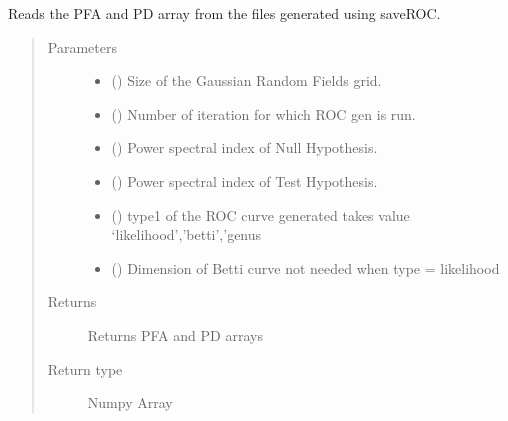 \documentclass[letterpaper,10pt,english]{sphinxmanual}
\begin{document}
\begin{fulllineitems}
\label{\detokenize{utilities:utilities.readROC}}
\sphinxAtStartPar
Reads the PFA and PD array from the files generated using saveROC.
\begin{quote}\begin{description}
\item[{Parameters}] \leavevmode\begin{itemize}
\item {} 
\sphinxAtStartPar
{} () \textendash{} Size of the Gaussian Random Fields grid.

\item {} 
\sphinxAtStartPar
{} () \textendash{} Number of iteration for which ROC gen is run.

\item {} 
\sphinxAtStartPar
{} () \textendash{} Power spectral index of Null Hypothesis.

\item {} 
\sphinxAtStartPar
{} () \textendash{} Power spectral index of Test Hypothesis.

\item {} 
\sphinxAtStartPar
{} () \textendash{} type1 of the ROC curve generated takes value ‘likelihood’,’betti’,’genus

\item {} 
\sphinxAtStartPar
{} () \textendash{} Dimension of Betti curve not needed when type = likelihood

\end{itemize}

\item[{Returns}] \leavevmode
\sphinxAtStartPar
Returns PFA and PD arrays

\item[{Return type}] \leavevmode
\sphinxAtStartPar
Numpy Array

\end{description}\end{quote}

\end{fulllineitems}
\end{document}
